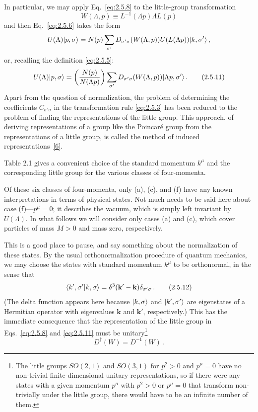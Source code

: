In particular, we may apply Eq.~\eqref{eq:2.5.8} to the little-group transformation
\begin{equation}
W(\Lambda,p)\equiv L^{-1}(\Lambda p)\Lambda L(p)
\tag{2.5.10}\label{eq:2.5.10}
\end{equation}
and then Eq.~\eqref{eq:2.5.6} takes the form
\[
U(\Lambda)\lvert p,\sigma\rangle
=N(p)\sum_{\sigma'}D_{\sigma'\sigma}(W(\Lambda,p))
U(L(\Lambda p))\lvert k,\sigma'\rangle\,,
\]
or, recalling the definition \eqref{eq:2.5.5}:
\begin{equation}
U(\Lambda)\lvert p,\sigma\rangle
=\left(\frac{N(p)}{N(\Lambda p)}\right)
\sum_{\sigma'}D_{\sigma'\sigma}(W(\Lambda,p))
\lvert \Lambda p,\sigma'\rangle\,.
\tag{2.5.11}\label{eq:2.5.11}
\end{equation}
Apart from the question of normalization, the problem of determining the
coefficients $C_{\sigma'\sigma}$ in the transformation rule \eqref{eq:2.5.3} has been
reduced to the problem of finding the representations of the little group.
This approach, of deriving representations of a group like the
Poincar\'e group from the representations of a little group, is called the method
of induced representations~\hyperref[ref:2.6]{[6]}.

Table 2.1 gives a convenient choice of the standard momentum $k^\mu$ and the
corresponding little group for the various classes of four-momenta.

Of these six classes of four-momenta, only (a), (c), and (f) have any known
interpretations in terms of physical states. Not much needs to be said here
about case (f)---$p^\mu=0$; it describes the vacuum, which is simply left
invariant by $U(\Lambda)$. In what follows we will consider only cases (a) and
(c), which cover particles of mass $M>0$ and mass zero, respectively.

This is a good place to pause, and say something about the normalization of
these states. By the usual orthonormalization procedure of quantum mechanics,
we may choose the states with standard momentum $k^\mu$ to be orthonormal, in
the sense that
\begin{equation}
\langle k',\sigma' | k,\sigma\rangle
=\delta^3(\mathbf{k}'-\mathbf{k})\delta_{\sigma'\sigma}\,.
\tag{2.5.12}\label{eq:2.5.12}
\end{equation}
(The delta function appears here because $\lvert k,\sigma\rangle$ and
$\lvert k',\sigma'\rangle$ are eigenstates of a Hermitian operator with eigenvalues
$\mathbf{k}$ and $\mathbf{k}'$, respectively.) This has the immediate
consequence that the representation of the little group in Eqs.~\eqref{eq:2.5.8} and
\eqref{eq:2.5.11} must be unitary\footnote{The little groups $SO(2,1)$ and $SO(3,1)$
for $p^2>0$ and $p^\mu=0$ have no non-trivial finite-dimensional unitary
representations, so if there were any states with a given momentum $p^\mu$
with $p^2>0$ or $p^\mu=0$ that transform non-trivially under the little group,
there would have to be an infinite number of them.}
\begin{equation}
D^\dagger(W)=D^{-1}(W)\,.
\tag{2.5.13}\label{eq:2.5.13}
\end{equation}

